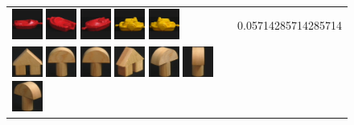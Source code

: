 \begin{figure}[!bp]
\begin{tabular}{m{11cm} | m{3cm} |}
\includegraphics[width=1cm]{coil/beeld-19.eps}
\includegraphics[width=1cm]{coil/beeld-22.eps}
\includegraphics[width=1cm]{coil/beeld-21.eps}
\includegraphics[width=1cm]{coil/beeld-12.eps}
\includegraphics[width=1cm]{coil/beeld-13.eps}
& {\scriptsize 0.05714285714285714}
\\
\includegraphics[width=1cm]{coil/beeld-42.eps}
\includegraphics[width=1cm]{coil/beeld-0.eps}
\includegraphics[width=1cm]{coil/beeld-1.eps}
\includegraphics[width=1cm]{coil/beeld-45.eps}
\includegraphics[width=1cm]{coil/beeld-3.eps}
\includegraphics[width=1cm]{coil/beeld-5.eps}
\includegraphics[width=1cm]{coil/beeld-4.eps}

\end{tabular}
\end{figure}
